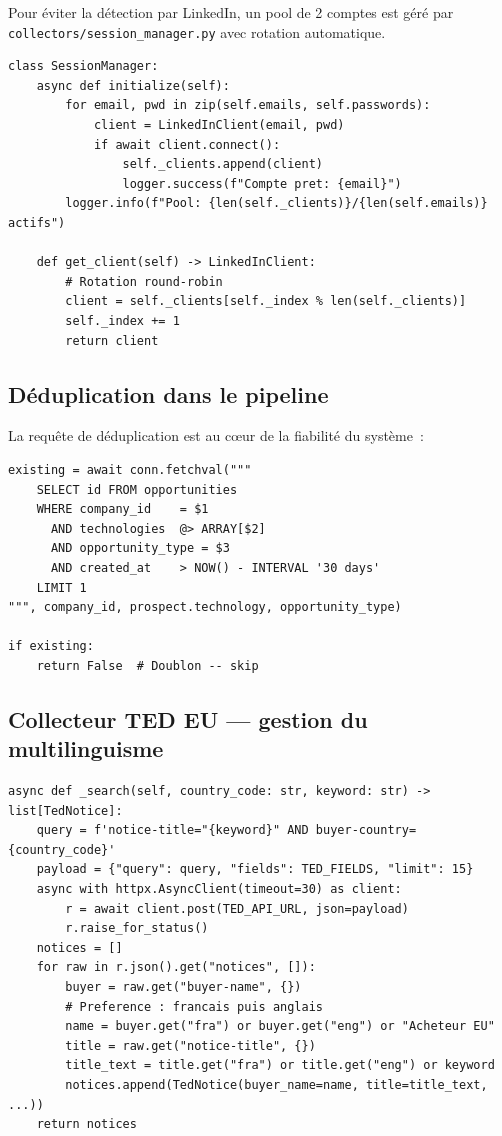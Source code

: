 Pour éviter la détection par LinkedIn, un pool de 2 comptes est géré par
\texttt{collectors/session\_manager.py} avec rotation automatique.

\begin{lstlisting}[language=Python3, caption={Rotation de comptes LinkedIn (extrait)}, label=lst:session]
class SessionManager:
    async def initialize(self):
        for email, pwd in zip(self.emails, self.passwords):
            client = LinkedInClient(email, pwd)
            if await client.connect():
                self._clients.append(client)
                logger.success(f"Compte pret: {email}")
        logger.info(f"Pool: {len(self._clients)}/{len(self.emails)} actifs")

    def get_client(self) -> LinkedInClient:
        # Rotation round-robin
        client = self._clients[self._index % len(self._clients)]
        self._index += 1
        return client
\end{lstlisting}

\subsection{Déduplication dans le pipeline}

La requête de déduplication est au cœur de la fiabilité du système~:

\begin{lstlisting}[language=Python3, caption={Requête de déduplication 30 jours}, label=lst:dedup]
existing = await conn.fetchval("""
    SELECT id FROM opportunities
    WHERE company_id    = $1
      AND technologies  @> ARRAY[$2]
      AND opportunity_type = $3
      AND created_at    > NOW() - INTERVAL '30 days'
    LIMIT 1
""", company_id, prospect.technology, opportunity_type)

if existing:
    return False  # Doublon -- skip
\end{lstlisting}

\subsection{Collecteur TED EU — gestion du multilinguisme}

\begin{lstlisting}[language=Python3, caption={Extraction multilingue du nom acheteur TED}, label=lst:ted_impl]
async def _search(self, country_code: str, keyword: str) -> list[TedNotice]:
    query = f'notice-title="{keyword}" AND buyer-country={country_code}'
    payload = {"query": query, "fields": TED_FIELDS, "limit": 15}
    async with httpx.AsyncClient(timeout=30) as client:
        r = await client.post(TED_API_URL, json=payload)
        r.raise_for_status()
    notices = []
    for raw in r.json().get("notices", []):
        buyer = raw.get("buyer-name", {})
        # Preference : francais puis anglais
        name = buyer.get("fra") or buyer.get("eng") or "Acheteur EU"
        title = raw.get("notice-title", {})
        title_text = title.get("fra") or title.get("eng") or keyword
        notices.append(TedNotice(buyer_name=name, title=title_text, ...))
    return notices
\end{lstlisting}

